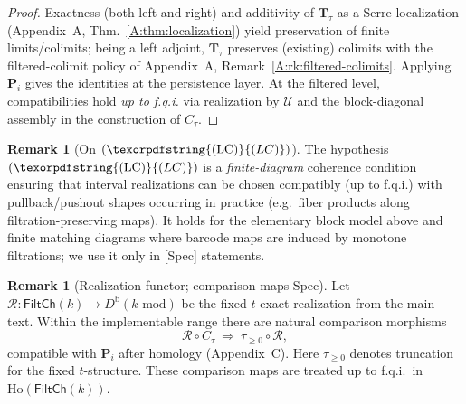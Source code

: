 \documentclass[11pt]{article}
\newcommand{\Ho}{\mathrm{Ho}}
\numberwithin{equation}{section}
\theoremstyle{definition}
\newtheorem{remark}[theorem]{Remark}
\DeclareRobustCommand{\LC}{\texorpdfstring{\ensuremath{\mathrm{(LC)}}}{(LC)}}
\begin{document}
\begin{proof}
Exactness (both left and right) and additivity of \(\mathbf{T}_\tau\) as a Serre localization (Appendix~A, Thm.~\ref{A:thm:localization}) yield preservation of finite limits/colimits; being a left adjoint, \(\mathbf{T}_\tau\) preserves (existing) colimits with the filtered-colimit policy of Appendix~A, Remark~\ref{A:rk:filtered-colimits}.
Applying \(\mathbf{P}_i\) gives the identities at the persistence layer.
At the filtered level, compatibilities hold \emph{up to f.q.i.} via realization by \(\mathcal{U}\) and the block-diagonal assembly in the construction of \(C_\tau\).
\end{proof}

\begin{remark}[On \((\LC)\)]
The hypothesis \((\LC)\) is a \emph{finite-diagram} coherence condition ensuring that interval realizations can be chosen compatibly (up to f.q.i.) with pullback/pushout shapes occurring in practice (e.g.\ fiber products along filtration-preserving maps).
It holds for the elementary block model above and finite matching diagrams where barcode maps are induced by monotone filtrations; we use it only in \textup{[Spec]} statements.
\end{remark}

\begin{remark}[Realization functor; comparison maps \textup{\lbrack}Spec\textup{\rbrack}]
Let \(\mathcal{R}:\mathsf{FiltCh}(k)\to D^{\mathrm{b}}(k\text{-mod})\) be the fixed \(t\)-exact realization from the main text.
Within the implementable range there are natural comparison morphisms
\[
\mathcal{R}\circ C_\tau\ \Longrightarrow\ \tau_{\ge 0}\circ \mathcal{R},
\]
compatible with \(\mathbf{P}_i\) after homology (Appendix~C).
Here \(\tau_{\ge 0}\) denotes truncation for the fixed \(t\)-structure.
These comparison maps are treated up to f.q.i.\ in \(\Ho(\mathsf{FiltCh}(k))\).
\end{remark}

\end{document}
